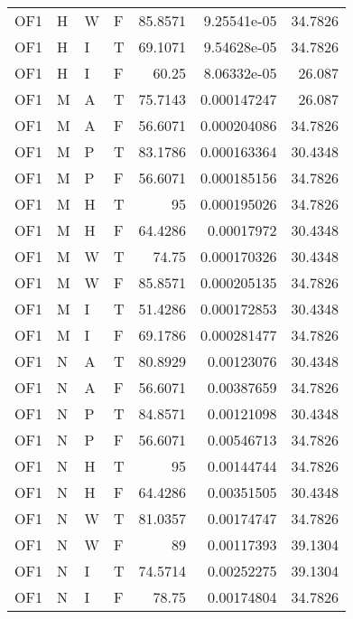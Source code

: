 \begin{table}[!htb]
{\begin{tabular}{llllrrr}
            OF1      & H     & W     & F          & 85.8571    & 9.25541e-05 & 34.7826  \\
            OF1      & H     & I     & T          & 69.1071    & 9.54628e-05 & 34.7826  \\
            OF1      & H     & I     & F          & 60.25      & 8.06332e-05 & 26.087   \\
            OF1      & M     & A     & T          & 75.7143    & 0.000147247 & 26.087   \\
            OF1      & M     & A     & F          & 56.6071    & 0.000204086 & 34.7826  \\
            OF1      & M     & P     & T          & 83.1786    & 0.000163364 & 30.4348  \\
            OF1      & M     & P     & F          & 56.6071    & 0.000185156 & 34.7826  \\
            OF1      & M     & H     & T          & 95         & 0.000195026 & 34.7826  \\
            OF1      & M     & H     & F          & 64.4286    & 0.00017972  & 30.4348  \\
            OF1      & M     & W     & T          & 74.75      & 0.000170326 & 30.4348  \\
            OF1      & M     & W     & F          & 85.8571    & 0.000205135 & 34.7826  \\
            OF1      & M     & I     & T          & 51.4286    & 0.000172853 & 30.4348  \\
            OF1      & M     & I     & F          & 69.1786    & 0.000281477 & 34.7826  \\
            OF1      & N     & A     & T          & 80.8929    & 0.00123076  & 30.4348  \\
            OF1      & N     & A     & F          & 56.6071    & 0.00387659  & 34.7826  \\
            OF1      & N     & P     & T          & 84.8571    & 0.00121098  & 30.4348  \\
            OF1      & N     & P     & F          & 56.6071    & 0.00546713  & 34.7826  \\
            OF1      & N     & H     & T          & 95         & 0.00144744  & 34.7826  \\
            OF1      & N     & H     & F          & 64.4286    & 0.00351505  & 30.4348  \\
            OF1      & N     & W     & T          & 81.0357    & 0.00174747  & 34.7826  \\
            OF1      & N     & W     & F          & 89         & 0.00117393  & 39.1304  \\
            OF1      & N     & I     & T          & 74.5714    & 0.00252275  & 39.1304  \\
            OF1      & N     & I     & F          & 78.75      & 0.00174804  & 34.7826  \\
            \hline
        \end{tabular}
    }{}
\end{table}